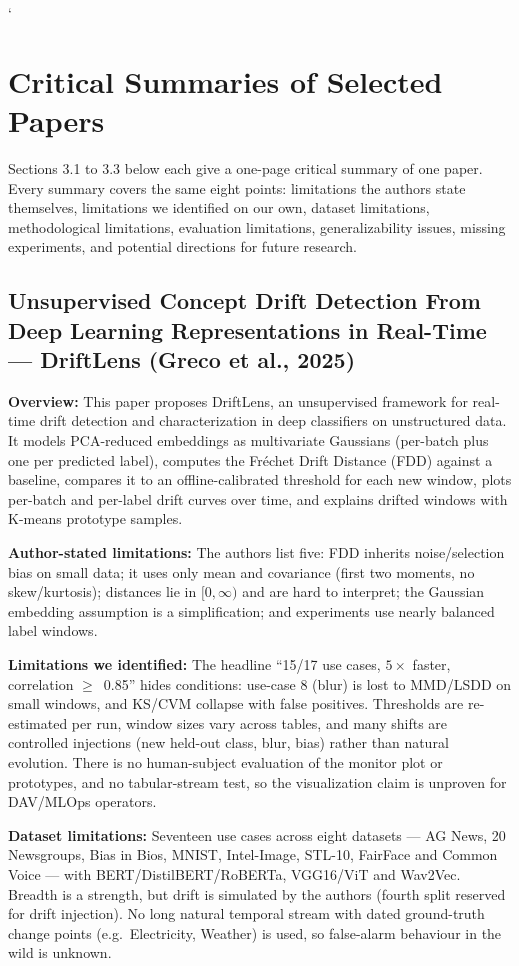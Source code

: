 `\documentclass[10pt]{article}
\newcommand{\sumitem}[2]{\noindent\textbf{#1:} #2\par}
\begin{document}
\section{Critical Summaries of Selected Papers}

Sections 3.1 to 3.3 below each give a one-page critical summary of one paper. Every summary covers the same eight points: limitations the authors state themselves, limitations we identified on our own, dataset limitations, methodological limitations, evaluation limitations, generalizability issues, missing experiments, and potential directions for future research.

\subsection{Unsupervised Concept Drift Detection From Deep Learning Representations in Real-Time --- DriftLens (Greco et al., 2025)}

\sumitem{Overview}{This paper proposes DriftLens, an unsupervised framework for real-time drift detection and characterization in deep classifiers on unstructured data. It models PCA-reduced embeddings as multivariate Gaussians (per-batch plus one per predicted label), computes the Fr\'echet Drift Distance (FDD) against a baseline, compares it to an offline-calibrated threshold for each new window, plots per-batch and per-label drift curves over time, and explains drifted windows with K-means prototype samples.}

\sumitem{Author-stated limitations}{The authors list five: FDD inherits noise/selection bias on small data; it uses only mean and covariance (first two moments, no skew/kurtosis); distances lie in $[0,\infty)$ and are hard to interpret; the Gaussian embedding assumption is a simplification; and experiments use nearly balanced label windows.}

\sumitem{Limitations we identified}{The headline ``15/17 use cases, $5\times$ faster, correlation $\geq$~0.85'' hides conditions: use-case 8 (blur) is lost to MMD/LSDD on small windows, and KS/CVM collapse with false positives. Thresholds are re-estimated per run, window sizes vary across tables, and many shifts are controlled injections (new held-out class, blur, bias) rather than natural evolution. There is no human-subject evaluation of the monitor plot or prototypes, and no tabular-stream test, so the visualization claim is unproven for DAV/MLOps operators.}

\sumitem{Dataset limitations}{Seventeen use cases across eight datasets --- AG News, 20 Newsgroups, Bias in Bios, MNIST, Intel-Image, STL-10, FairFace and Common Voice --- with BERT/DistilBERT/RoBERTa, VGG16/ViT and Wav2Vec. Breadth is a strength, but drift is simulated by the authors (fourth split reserved for drift injection). No long natural temporal stream with dated ground-truth change points (e.g.\ Electricity, Weather) is used, so false-alarm behaviour in the wild is unknown.}
\end{document}
